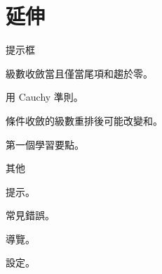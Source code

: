 \documentclass[aspectratio=169,11pt]{beamer}
\begin{document}
\section{\optional 延伸}
\begin{frame}{提示框}
  \begin{keyidea}[收斂]
  級數收斂當且僅當尾項和趨於零。
  \end{keyidea}
  \begin{proofidea}
  用 Cauchy 準則。
  \end{proofidea}
  \begin{warning}
  條件收斂的級數重排後可能改變和。
  \end{warning}
  \begin{keypoint}
  第一個學習要點。
  \end{keypoint}
\end{frame}
\begin{frame}{其他}
  \begin{tip}提示。\end{tip}
  \begin{pitfall}常見錯誤。\end{pitfall}
  \begin{chapterguide}導覽。\end{chapterguide}
  \begin{setup}設定。\end{setup}
\end{frame}
\end{document}
